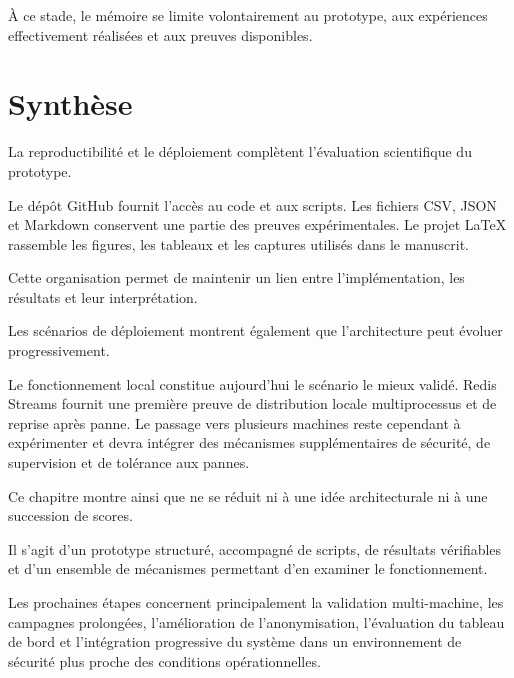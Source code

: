 À ce stade, le mémoire se limite volontairement au prototype, aux expériences effectivement réalisées et aux preuves disponibles.

\section{Synthèse}

La reproductibilité et le déploiement complètent l'évaluation scientifique du prototype.

Le dépôt GitHub fournit l'accès au code et aux scripts. Les fichiers CSV, JSON et Markdown conservent une partie des preuves expérimentales. Le projet LaTeX rassemble les figures, les tableaux et les captures utilisés dans le manuscrit.

Cette organisation permet de maintenir un lien entre l'implémentation, les résultats et leur interprétation.

Les scénarios de déploiement montrent également que l'architecture peut évoluer progressivement.

Le fonctionnement local constitue aujourd'hui le scénario le mieux validé. Redis Streams fournit une première preuve de distribution locale multiprocessus et de reprise après panne. Le passage vers plusieurs machines reste cependant à expérimenter et devra intégrer des mécanismes supplémentaires de sécurité, de supervision et de tolérance aux pannes.

Ce chapitre montre ainsi que \logminer{} ne se réduit ni à une idée architecturale ni à une succession de scores.

Il s'agit d'un prototype structuré, accompagné de scripts, de résultats vérifiables et d'un ensemble de mécanismes permettant d'en examiner le fonctionnement.

Les prochaines étapes concernent principalement la validation multi-machine, les campagnes prolongées, l'amélioration de l'anonymisation, l'évaluation du tableau de bord et l'intégration progressive du système dans un environnement de sécurité plus proche des conditions opérationnelles.

